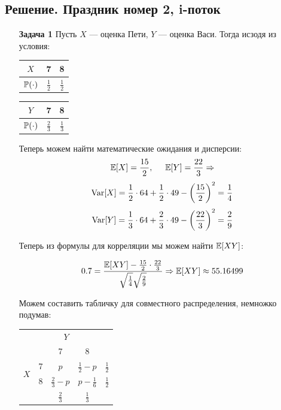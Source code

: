 \documentclass[12pt, a4paper]{article}\usepackage[]{graphicx}\usepackage[]{color}
\begin{document}
\subsection{Решение. Праздник номер 2, i-поток}

\begin{enumerate}
\item[\textbf{Задача 1}]
Пусть $X$ — оценка Пети, $Y$ — оценка Васи. Тогда исзодя из условия:
\begin{center}

\begin{tabular}{c|c|c}
$X$ & 7 & 8\\
\hline
$\P(\cdot)$ & $\frac{1}{2}$ & $\frac{1}{2}$
\end{tabular}
\hspace{1cm}
\begin{tabular}{c|c|c}
$Y$ & 7 & 8\\
\hline
$\P(\cdot)$ & $\frac{2}{3}$ & $\frac{1}{3}$
\end{tabular}
\end{center}

Теперь можем найти математические ожидания и дисперсии:
$$
\E[X] = \frac{15}{2}, \hspace{0.5cm} \E[Y] = \frac{22}{3} \Rightarrow
$$
$$
\Var[X] = \frac{1}{2}\cdot 64 + \frac{1}{2}\cdot 49 - \left(\frac{15}{2}\right)^2 = \frac{1}{4}
$$
$$
\Var[Y] = \frac{1}{3}\cdot 64 + \frac{2}{3}\cdot 49 - \left(\frac{22}{3}\right)^2 = \frac{2}{9}
$$

Теперь из формулы для корреляции мы можем найти $\E[XY]$:

$$
0.7 = \frac{\E[XY]-\frac{15}{2}\cdot\frac{22}{3}}{\sqrt{\frac{1}{4}}\sqrt{\frac{2}{9}}} \Rightarrow \E[XY] \approx 55.16499
$$

Можем составить табличку для совместного распределения, немножко подумав:

\begin{center}
\begin{tabular}{c|c|c|c|c|}
\multicolumn{5}{c}{\hspace*{1cm}$Y$}\\
\cline{2-5}
\multirow{4}{*}{$X$}  & &  7 & 8 &  \\
\cline{2-5}
& 7 & $p$ & $\frac{1}{2}-p$&$\frac{1}{2}$\\
\cline{2-5}
& 8  & $\frac{2}{3}-p$&$p-\frac{1}{6}$ & $\frac{1}{2}$\\
\cline{2-5}
& & $\frac{2}{3}$ & $\frac{1}{3}$& \\
\cline{2-5}


\end{tabular}
\end{center}
\end{enumerate}
\end{document}
